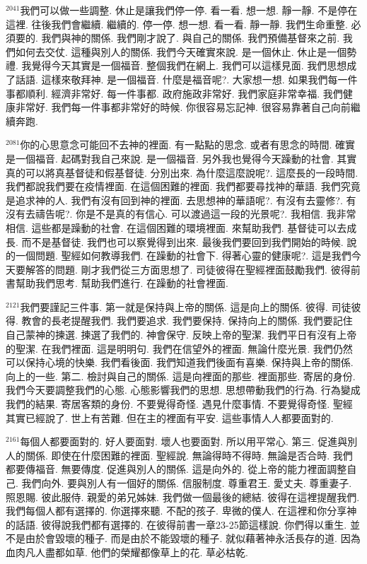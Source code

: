 \documentclass{book}
\begin{document}
$^{2041}$我們可以做一些調整.
休止是讓我們停一停.
看一看.
想一想.
靜一靜.
不是停在這裡.
往後我們會繼續.
繼續的.
停一停.
想一想.
看一看.
靜一靜.
我們生命重整.
必須要的.
我們與神的關係.
我們剛才說了.
與自己的關係.
我們預備基督來之前.
我們如何去交仗.
這種與別人的關係.
我們今天確實來說.
是一個休止.
休止是一個勢禮.
我覺得今天其實是一個福音.
整個我們在網上.
我們可以這樣見面.
我們思想成了話語.
這樣來敬拜神.
是一個福音.
什麼是福音呢?.
大家想一想.
如果我們每一件事都順利.
經濟非常好.
每一件事都.
政府施政非常好.
我們家庭非常幸福.
我們健康非常好.
我們每一件事都非常好的時候.
你很容易忘記神.
很容易靠著自己向前繼續奔跑.

$^{2081}$你的心思意念可能回不去神的裡面.
有一點點的思念.
或者有思念的時間.
確實是一個福音.
起碼對我自己來說.
是一個福音.
另外我也覺得今天躁動的社會.
其實真的可以將真基督徒和假基督徒.
分別出來.
為什麼這麼說呢?.
這麼長的一段時間.
我們都說我們要在疫情裡面.
在這個困難的裡面.
我們都要尋找神的華語.
我們究竟是追求神的人.
我們有沒有回到神的裡面.
去思想神的華語呢?.
有沒有去靈修?.
有沒有去禱告呢?.
你是不是真的有信心.
可以渡過這一段的光景呢?.
我相信.
我非常相信.
這些都是躁動的社會.
在這個困難的環境裡面.
來幫助我們.
基督徒可以去成長.
而不是基督徒.
我們也可以察覺得到出來.
最後我們要回到我們開始的時候.
說的一個問題.
聖經如何教導我們.
在躁動的社會下.
得著心靈的健康呢?.
這是我們今天要解答的問題.
剛才我們從三方面思想了.
司徒彼得在聖經裡面鼓勵我們.
彼得前書幫助我們思考.
幫助我們進行.
在躁動的社會裡面.

$^{2121}$我們要謹記三件事.
第一就是保持與上帝的關係.
這是向上的關係.
彼得.
司徒彼得.
教會的長老提醒我們.
我們要追求.
我們要保持.
保持向上的關係.
我們要記住自己蒙神的揀選.
揀選了我們的.
神會保守.
反映上帝的聖潔.
我們平日有沒有上帝的聖潔.
在我們裡面.
這是明明句.
我們在信望外的裡面.
無論什麼光景.
我們仍然可以保持心境的快樂.
我們看後面.
我們知道我們後面有喜樂.
保持與上帝的關係.
向上的一些.
第二.
檢討與自己的關係.
這是向裡面的那些.
裡面那些.
寄居的身份.
我們今天要調整我們的心態.
心態影響我們的思想.
思想帶動我們的行為.
行為變成我們的結果.
寄居客類的身份.
不要覺得奇怪.
遇見什麼事情.
不要覺得奇怪.
聖經其實已經說了.
世上有苦難.
但在主的裡面有平安.
這些事情人人都要面對的.

$^{2161}$每個人都要面對的.
好人要面對.
壞人也要面對.
所以用平常心.
第三.
促進與別人的關係.
即使在什麼困難的裡面.
聖經說.
無論得時不得時.
無論是否合時.
我們都要傳福音.
無要傳度.
促進與別人的關係.
這是向外的.
從上帝的能力裡面調整自己.
我們向外.
要與別人有一個好的關係.
信服制度.
尊重君王.
愛丈夫.
尊重妻子.
照恩賜.
彼此服侍.
親愛的弟兄姊妹.
我們做一個最後的總結.
彼得在這裡提醒我們.
我們每個人都有選擇的.
你選擇來聽.
不配的孩子.
卑微的僕人.
在這裡和你分享神的話語.
彼得說我們都有選擇的.
在彼得前書一章23-25節這樣說.
你們得以重生.
並不是由於會毀壞的種子.
而是由於不能毀壞的種子.
就似藉著神永活長存的道.
因為血肉凡人盡都如草.
他們的榮耀都像草上的花.
草必枯乾.
\end{document}
